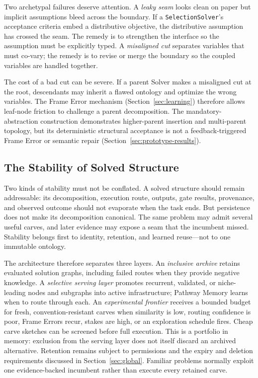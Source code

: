 \documentclass[11pt]{article}
\let\oldtexttt\texttt
\renewcommand{\texttt}[1]{\oldtexttt{\small #1}}
\begin{document}
Two archetypal failures deserve attention. A \emph{leaky seam} looks clean on paper but implicit assumptions bleed across the boundary. If a \texttt{SelectionSolver}'s acceptance criteria embed a distributive objective, the distributive assumption has crossed the seam. The remedy is to strengthen the interface so the assumption must be explicitly typed. A \emph{misaligned cut} separates variables that must co-vary; the remedy is to revise or merge the boundary so the coupled variables are handled together.

The cost of a bad cut can be severe. If a parent Solver makes a misaligned cut at the root, descendants may inherit a flawed ontology and optimize the wrong variables. The Frame Error mechanism (Section~\ref{sec:learning}) therefore allows leaf-node friction to challenge a parent decomposition. The mandatory-abstraction construction demonstrates higher-parent insertion and multi-parent topology, but its deterministic structural acceptance is not a feedback-triggered Frame Error or semantic repair (Section~\ref{sec:prototype-results}).

\subsection{The Stability of Solved Structure}
\label{sec:stability}

Two kinds of stability must not be conflated. A solved structure should remain addressable: its decomposition, execution route, outputs, gate results, provenance, and observed outcome should not evaporate when the task ends. But persistence does not make its decomposition canonical. The same problem may admit several useful carves, and later evidence may expose a seam that the incumbent missed. Stability belongs first to identity, retention, and learned reuse---not to one immutable ontology.

The architecture therefore separates three layers. An \emph{inclusive archive} retains evaluated solution graphs, including failed routes when they provide negative knowledge. A \emph{selective serving layer} promotes recurrent, validated, or niche-leading nodes and subgraphs into active infrastructure; Pathway Memory learns when to route through each. An \emph{experimental frontier} receives a bounded budget for fresh, convention-resistant carves when similarity is low, routing confidence is poor, Frame Errors recur, stakes are high, or an exploration schedule fires. Cheap carve sketches can be screened before full execution. This is a portfolio in memory: exclusion from the serving layer does not itself discard an archived alternative. Retention remains subject to permissions and the expiry and deletion requirements discussed in Section~\ref{sec:global}. Familiar problems normally exploit one evidence-backed incumbent rather than execute every retained carve.
\end{document}
